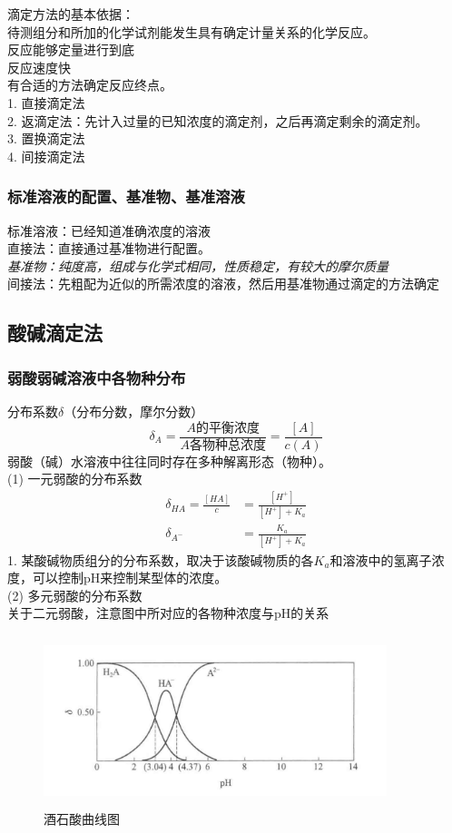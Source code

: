 \documentclass[utf8,a4paper,12pt]{ctexart}
\begin{document}
滴定方法的基本依据：\\
待测组分和所加的化学试剂能发生具有确定计量关系的化学反应。\\
反应能够定量进行到底\\
反应速度快\\
有合适的方法确定反应终点。\\
1. 直接滴定法\\
2. 返滴定法：先计入过量的已知浓度的滴定剂，之后再滴定剩余的滴定剂。\\
3. 置换滴定法\\
4. 间接滴定法\\
\subsubsection{标准溶液的配置、基准物、基准溶液}
标准溶液：已经知道准确浓度的溶液\\
直接法：直接通过基准物进行配置。\\
\emph{基准物：纯度高，组成与化学式相同，性质稳定，有较大的摩尔质量}\\
间接法：先粗配为近似的所需浓度的溶液，然后用基准物通过滴定的方法确定\\

\subsection{酸碱滴定法}
\subsubsection{弱酸弱碱溶液中各物种分布}
分布系数$\delta$（分布分数，摩尔分数）\\
\[
	\delta_A = \frac{A\text{的平衡浓度}}{A\text{各物种总浓度}} = \frac{[A]}{c(A)}
\]
弱酸（碱）水溶液中往往同时存在多种解离形态（物种）。\\
(1) 一元弱酸的分布系数
\begin{align*}
\delta_{HA} = \frac{[HA]}{c} &= \frac{[H^+]}{[H^+]+K_a}\\
\delta_{A^-} &= \frac{K_a}{[H^+]+K_a}
\end{align*}
1. 某酸碱物质组分的分布系数，取决于该酸碱物质的各$K_a$和溶液中的氢离子浓度，可以控制pH来控制某型体的浓度。\\
(2) 多元弱酸的分布系数\\
关于二元弱酸，注意图中所对应的各物种浓度与pH的关系\\
\begin{figure}[H]
\centering
\includegraphics[width = 10cm,height = 5cm]{titration1.jpeg}
\caption{酒石酸曲线图}
\end{figure}
\end{document}
